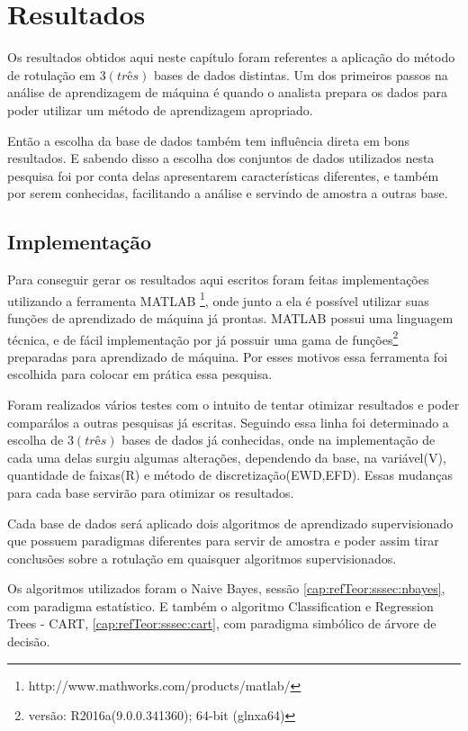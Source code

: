 \chapter{Resultados}\label{cap:resultados}

Os resultados obtidos aqui neste capítulo foram referentes a aplicação do método de rotulação em ${3(três)}$ bases de dados distintas. Um dos primeiros passos na análise de aprendizagem de máquina é quando o analista prepara os dados para poder utilizar  um método de aprendizagem apropriado. 

Então  a escolha da base de dados também tem influência direta em bons resultados. E sabendo disso a escolha dos conjuntos de dados utilizados nesta pesquisa foi por conta delas apresentarem características diferentes, e também por serem conhecidas, facilitando a análise e servindo de amostra a outras base.

\section{Implementação}

Para conseguir gerar os resultados aqui escritos foram feitas implementações utilizando a ferramenta MATLAB \footnote{http://www.mathworks.com/products/matlab/}, onde junto  a ela é possível utilizar suas funções de aprendizado de máquina já prontas. MATLAB possui uma linguagem técnica, e de fácil implementação por já possuir uma gama de funções\footnote{versão: R2016a(9.0.0.341360); 64-bit (glnxa64)} preparadas para aprendizado de máquina. Por esses motivos essa ferramenta foi escolhida para colocar em prática essa pesquisa.

Foram realizados vários testes com o intuito de tentar otimizar resultados e poder comparálos a outras pesquisas já escritas. Seguindo essa linha foi determinado a escolha de ${3(três)}$ bases de dados já conhecidas, onde na implementação de cada uma delas surgiu algumas alterações, dependendo da base, na variável(V), quantidade de faixas(R) e método de discretização(EWD,EFD). Essas mudanças para cada base servirão para otimizar os resultados. 

Cada base de dados será aplicado dois algoritmos de aprendizado supervisionado que possuem paradigmas diferentes para servir de amostra e poder assim tirar conclusões sobre a rotulação em quaisquer algoritmos supervisionados.  

Os algoritmos utilizados foram o Naive Bayes, sessão \ref{cap:refTeor:sssec:nbayes}, com paradigma estatístico. E também o algoritmo Classification e Regression Trees - CART, \ref{cap:refTeor:sssec:cart}, com paradigma simbólico de  árvore de decisão.

